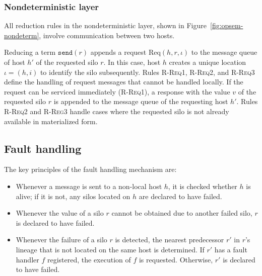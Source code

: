 \documentclass[preprint]{sigplanconf}
\theoremstyle{definition}
\theoremstyle{definition}
\begin{document}
\subsubsection{Nondeterministic layer}\label{sec:nondet-layer}

All reduction rules in the nondeterministic layer, shown in Figure~\ref{fig:opsem-nondeterm}, involve communication between two hosts.

Reducing a term $\texttt{send}(r)$ appends a request $\text{Req}(h, r, \iota)$ to the message queue of host $h'$ of the requested silo $r$. In this case, host $h$ creates a unique location $\iota = (h, i)$ to identify the silo subsequently. Rules \textsc{R-Req1}, \textsc{R-Req2}, and \textsc{R-Req3} define the handling of request messages that cannot be handled locally. If the request can be serviced immediately (\textsc{R-Req1}), a response with the value $v$ of the requested silo $r$ is appended to the message queue of the requesting host $h'$. Rules \textsc{R-Req2} and \textsc{R-Reg3} handle cases where the requested silo is not already available in materialized form.




\subsection{Fault handling}\label{sec:faults-opsem}

The key principles of the fault handling mechanism are:
\begin{itemize}
\item Whenever a message is sent to a non-local host $h$, it is checked whether $h$ is alive; if it is not, any silos located on $h$ are declared to have failed.
\item Whenever the value of a silo $r$ cannot be obtained due to another failed silo, $r$ is declared to have failed.
\item Whenever the failure of a silo $r$ is detected, the nearest predecessor $r'$ in $r$'s lineage that is not located on the same host is determined. If $r'$ has a fault handler $f$ registered, the execution of $f$ is requested. Otherwise, $r'$ is declared to have failed.
\end{itemize}
\end{document}
